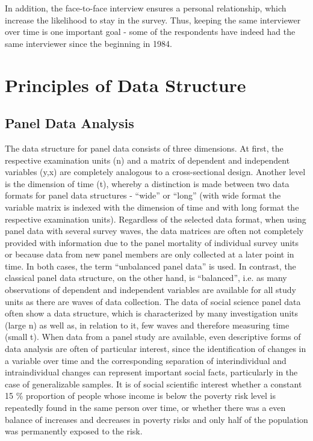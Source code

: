 \documentclass[letterpaper,10pt,openany,onesideH,english]{sphinxmanual}
\begin{document}
In addition, the face-to-face interview ensures a personal relationship, which increase the likelihood to stay in the survey. Thus, keeping the same interviewer over time is one important goal - some of the respondents have indeed had the same interviewer since the beginning in 1984.


\chapter{Principles of Data Structure}
\label{\detokenize{Principles of Data Structure/index:principles-of-data-structure}}\label{\detokenize{Principles of Data Structure/index::doc}}

\section{Panel Data Analysis}
\label{\detokenize{Principles of Data Structure/index:panel-data-analysis}}\label{\detokenize{Principles of Data Structure/index:analysis}}
The data structure for panel data consists of three dimensions. At first, the respective examination units (n) and a matrix of dependent and independent variables (y,x) are completely analogous to a cross-sectional design. Another level is the dimension of time (t), whereby a distinction is made between two data formats for panel data structures - “wide” or “long” (with wide format the variable matrix is indexed with the dimension of time and with long format the respective examination units). Regardless of the selected data format, when using panel data with several survey waves, the data matrices are often not completely provided with information due to the panel mortality of individual survey units or because data from new panel members are only collected at a later point in time. In both cases, the term “unbalanced panel data” is used. In contrast, the classical panel data structure, on the other hand, is “balanced”, i.e. as many observations of dependent and independent variables are available for all study units as there are waves of data collection.
The data of social science panel data often show a data structure, which is characterized by many investigation units (large n) as well as, in relation to it, few waves and therefore measuring time (small t).
When data from a panel study are available, even descriptive forms of data analysis are often of particular interest, since the identification of changes in a variable over time and the corresponding separation of interindividual and intraindividual changes can represent important social facts, particularly in the case of generalizable samples. It is of social scientific interest whether a constant 15 \% proportion of people whose income is below the poverty risk level is repeatedly found in the same person over time, or whether there was a even balance of increases and decreases in poverty risks and only half of the population was permanently exposed to the risk.
\end{document}
